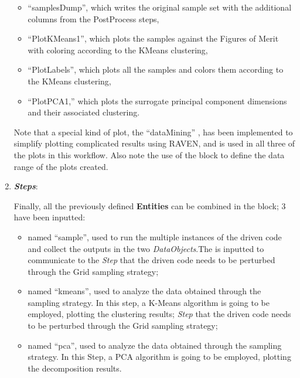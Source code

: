 \begin{enumerate}
\begin{itemize}
       \item ``samplesDump'', which writes the original sample set with the additional columns from the
         PostProcess steps,
       \item ``PlotKMeans1'', which plots the samples against the Figures of Merit with coloring according to
         the KMeans clustering,
       \item ``PlotLabels'', which plots all the samples and colors them according to the KMeans clustering,
       \item ``PlotPCA1,'' which plots the surrogate principal component dimensions and their associated clustering.
     \end{itemize}
     Note that a special kind of plot, the ``dataMining'' , has been implemented to simplify
     plotting complicated results using RAVEN, and is used in all three of the plots in this workflow.  Also
     note the use of the  block to define the data range of the plots created.
   \item \textbf{\textit{Steps}}:

   Finally, all the previously defined \textbf{Entities} can be combined in
   the  block;
   3  have been inputted:
   \begin{itemize}
     \item {} named ``sample'', used to run the
     multiple
     instances of the driven code and
     collect the outputs in the two \textit{DataObjects}.The  is inputted to communicate to the
     \textit{Step} that the driven code needs to
     be perturbed through the Grid sampling strategy;
     \item {} named ``kmeans'', used
     to analyze the data obtained through the sampling strategy. In
     this step, a K-Means algorithm is going to be employed, plotting
     the clustering results;
     \textit{Step} that the driven code needs to
     be perturbed through the Grid sampling strategy;
     \item {} named ``pca'', used
     to analyze the data obtained through the sampling strategy. In
     this Step, a PCA algorithm is going to be employed, plotting
     the decomposition results.
   \end{itemize}
\end{enumerate}

